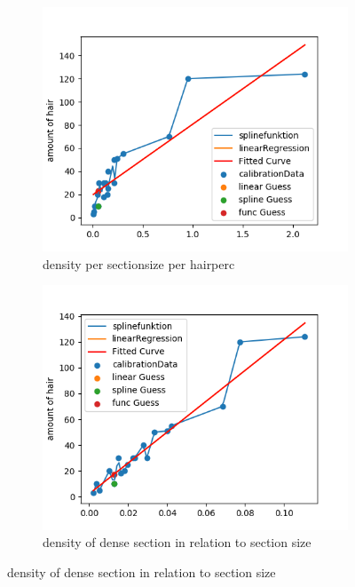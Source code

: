 \documentclass[german,a4paper, 12pt]{llncs}
\begin{document}
\begin{figure}[H]
	\medskip
	\begin{subfigure}{0.48\textwidth}
		\includegraphics[width=1.1\linewidth]{figBina/g3.png}
		\caption{density per sectionsize per hairperc} \label{fig:c}
	\end{subfigure}\hspace*{\fill}
	\begin{subfigure}{0.48\textwidth}
		\includegraphics[width=1.1\linewidth]{figBina/g4.png}
		\caption{density of dense section in relation to section size} \label{fig:d}
	\end{subfigure}
	

\end{figure}
\end{document}
